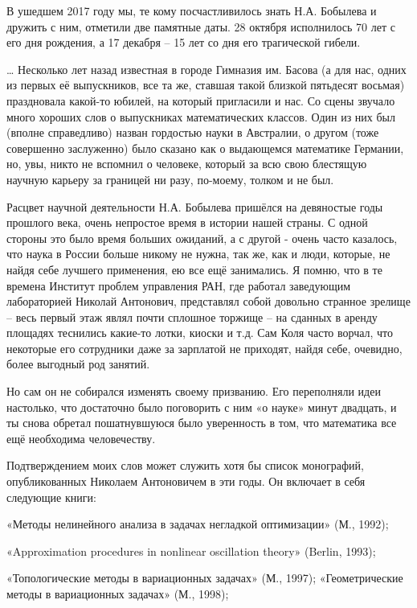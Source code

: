 \vzmscaption

В ушедшем 2017 году мы, те кому посчастливилось знать Н.А. Бобылева и дружить с ним, отметили две памятные даты. 28 октября исполнилось 70 лет с его дня рождения, а 17 декабря – 15 лет со дня его трагической гибели.

	… Несколько лет назад известная в городе Гимназия им. Басова (а для нас, одних из первых её выпускников, все та же, ставшая такой близкой пятьдесят восьмая) праздновала какой-то юбилей, на который пригласили и нас. Со сцены звучало много хороших слов о выпускниках математических классов. Один из них был (вполне справедливо) назван гордостью науки в Австралии, о другом (тоже совершенно заслуженно) было сказано как о выдающемся математике Германии, но, увы, никто не вспомнил о человеке, который за всю свою блестящую научную карьеру за границей ни разу, по-моему, толком и не был.

	Расцвет научной деятельности Н.А. Бобылева пришёлся на девяностые годы прошлого века, очень непростое время в истории нашей страны. С одной стороны это было время больших ожиданий, а с другой - очень часто казалось, что наука в России больше никому не нужна, так же, как и люди, которые, не найдя себе лучшего применения, ею все ещё занимались. Я помню, что в те времена Институт проблем управления РАН, где работал заведующим лабораторией Николай Антонович, представлял собой довольно странное зрелище – весь первый этаж являл почти сплошное торжище – на сданных в аренду площадях теснились какие-то лотки, киоски и т.д. Сам Коля часто ворчал, что некоторые его сотрудники даже за зарплатой не приходят, найдя себе, очевидно, более выгодный род занятий.

	Но сам он не собирался изменять своему призванию.  Его переполняли идеи настолько, что достаточно было поговорить с ним «о науке» минут двадцать, и ты снова обретал пошатнувшуюся было уверенность в том, что математика все ещё необходима человечеству.

	Подтверждением моих слов может служить хотя бы список монографий, опубликованных Николаем Антоновичем в эти годы. Он включает в себя следующие книги:

«Методы нелинейного анализа в задачах негладкой оптимизации» (М., 1992);

«Approximation procedures in nonlinear oscillation theory» (Berlin, 1993);

«Топологические методы в вариационных задачах» (М., 1997); «Геометрические методы в вариационных задачах» (М., 1998);

